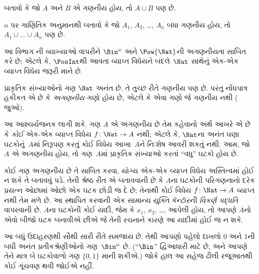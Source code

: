 \begin{prob}
બતાવો કે જો $A$ અને $B$ એ ગણનીય હોય, તો $A \cup B$ પણ છે.
\end{prob}

\begin{prob}
$n$ પર ગાણિતિક અનુમાનથી બતાવો કે જો $A_1$, $A_2$, \dots, $A_n$
બધા ગણનીય હોય, તો $A_1 \cup \dots \cup A_n$ પણ છે.
\end{prob}
\endgroup

\begingroup
\makeatletter{}\makeatother


\label{guunit:OLP-0039}


\begin{editorial}
  આ વિભાગ ની વ્યાખ્યાઓ વાપરીને
  $\Bin^\omega$ અને $\Pow{\Nat}$ની અગણનીયતા સાબિત કરે છે;
  એટલે કે, $\PosInt$થી આવતા વ્યાપ્ત વિધેયને બદલે~$\Nat$ સાથેનું
  એક-એક વ્યાપ્ત વિધેય જરૂરી માને છે.
\end{editorial}

\begin{explain}
પ્રાકૃતિક સંખ્યાઓનો ગણ $\Nat$ અનંત છે. તે તુચ્છ રીતે
ગણનીય પણ છે. પરંતુ નોંધપાત્ર હકીકત એ છે કે
\emph{અગણનીય} ગણો હોય છે, એટલે કે એવા ગણો જે
ગણનીય નથી ( જુઓ).

આ આશ્ચર્યજનક લાગી શકે. ગણ $A$ એ અગણનીય છે તેમ કહેવાનો
અર્થ આખરે એ છે કે \emph{કોઈ} એક-એક વ્યાપ્ત વિધેય $f \colon \Nat \to A$
નથી; એટલે કે, $\Nat$ના અનંત ઘણા ઘટકોનું~$A$માં નિરૂપણ
કરતું કોઈ વિધેય આખા~$A$ને નિઃશેષ આવરી શકતું નથી. આમ, જો $A$ એ
અગણનીય હોય, તો ગણ~$A$માં પ્રાકૃતિક સંખ્યાઓ કરતાં “વધુ”
ઘટકો હોય છે.

કોઈ ગણ અગણનીય છે તે સાબિત કરવા, યોગ્ય એક-એક વ્યાપ્ત વિધેય
અસ્તિત્વમાં હોઈ ન શકે તે બતાવવું પડે. તેની શ્રેષ્ઠ રીત એ બતાવવાની
છે કે $A$ના ઘટકોની પરિગણનાનો દરેક પ્રયત્ન ઓછામાં ઓછો એક
ઘટક છોડી જ દે છે; તેનાથી કોઈ વિધેય $f\colon \Nat \to A$
વ્યાપ્ત નથી તેમ મળે છે. આ સ્થાપિત કરવાની એક સામાન્ય યુક્તિ
કૅન્ટૉરની \emph{વિકર્ણ પદ્ધતિ} વાપરવાની છે. $A$ના ઘટકોની
કોઈ યાદી, જેમ કે $x_1$, $x_2$, \dots, આપેલી હોય, તો આપણે $A$નો
એવો બીજો ઘટક બનાવીએ છીએ જે તેની રચનાને કારણે આ યાદીમાં
હોઈ જ ન શકે.

આ બધું ઉદાહરણથી સૌથી સારી રીતે સમજાય છે. તેથી આપણો પહેલો દાખલો
$0$ અને $1$ની બધી અનંત પ્રતીકશ્રેણીઓનો ગણ~$\Bin^\omega$ છે.
(“$\Bin$” દ્વિઆધારી માટે છે, અને આપણે તેને માત્ર બે ઘટકોવાળો ગણ
$\{0,1\}$ માની શકીએ.)
જોકે હાલ આ સહેજ ઢીલી રજૂઆતથી કોઈ ગૂંચવણ થવી જોઈએ નહીં.
\end{explain}

